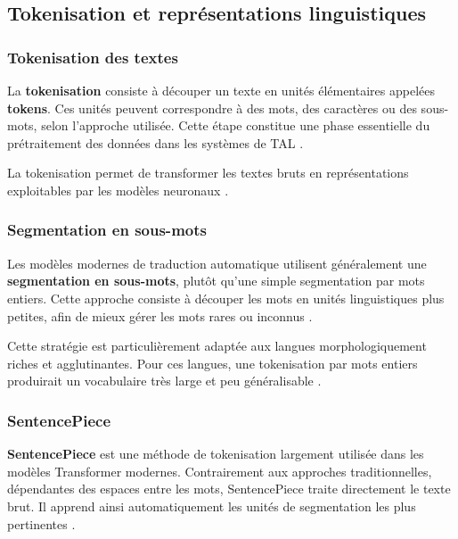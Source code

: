 \subsection{Tokenisation et représentations linguistiques}

\subsubsection{Tokenisation des textes}

La \textbf{tokenisation} consiste à découper un texte en unités élémentaires appelées \textbf{tokens}. Ces unités peuvent correspondre à des mots, des caractères ou des sous-mots, selon l'approche utilisée. Cette étape constitue une phase essentielle du prétraitement des données dans les systèmes de \ac{TAL} \cite{ranathunga2023neural}.

La tokenisation permet de transformer les textes bruts en représentations exploitables par les modèles neuronaux \cite{Goodfellow-et-al-2016}.

\subsubsection{Segmentation en sous-mots}

Les modèles modernes de traduction automatique utilisent généralement une \textbf{segmentation en sous-mots}, plutôt qu'une simple segmentation par mots entiers. Cette approche consiste à découper les mots en unités linguistiques plus petites, afin de mieux gérer les mots rares ou inconnus \cite{toraman2022impact}.

Cette stratégie est particulièrement adaptée aux langues morphologiquement riches et agglutinantes. Pour ces langues, une tokenisation par mots entiers produirait un vocabulaire très large et peu généralisable \cite{chen-fazio-2021-morphologically}.

\subsubsection{SentencePiece}

\textbf{\ac{SentencePiece}} est une méthode de tokenisation largement utilisée dans les modèles Transformer modernes. Contrairement aux approches traditionnelles, dépendantes des espaces entre les mots, SentencePiece traite directement le texte brut. Il apprend ainsi automatiquement les unités de segmentation les plus pertinentes \cite{meyer2024systematic}.

